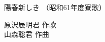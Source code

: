 \documentclass[10pt,b5j]{tarticle} %
\begin{document}
\begin{minipage}[c]{0.7\hsize} %
    \begin{center}
        {\LARGE
            陽春新しき %
        }
        {\small 
            （昭和61年度寮歌） %
        }
    \end{center}
\end{minipage}
\begin{minipage}[c]{0.3\hsize} %
    \begin{flushright} %
        原沢辰明君 作歌\\山森聡君 作曲 %
    \end{flushright}
\end{minipage}
\end{document}
